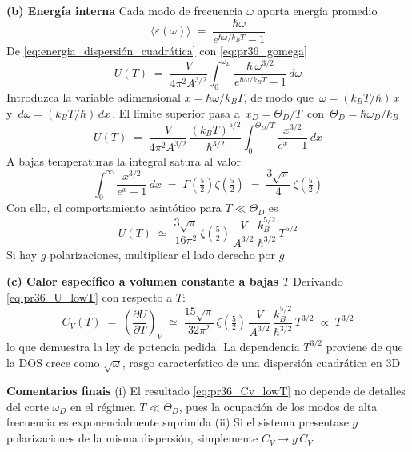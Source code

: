 \documentclass{article}
\begin{document}
\noindent\textbf{(b) Energía interna}\;
Cada modo de frecuencia $\omega$ aporta energía promedio
\begin{equation}
  \langle \varepsilon(\omega) \rangle \;=\; \frac{\hbar\omega}{e^{\hbar\omega/k_BT}-1}
  \label{eq:pr36_eps}
\end{equation}
De \eqref{eq:energia_dispersión_cuadrática} con \eqref{eq:pr36_gomega}
\begin{equation}
  U(T) \;=\; \frac{V}{4\pi^2 A^{3/2}} \int_0^{\omega_D} 
  \frac{\hbar\,\omega^{3/2}}{e^{\hbar\omega/k_BT}-1}\,d\omega
  \label{eq:pr36_U_raw}
\end{equation}
Introduzca la variable adimensional $x=\hbar\omega/k_BT$, de modo que $\,\omega=(k_BT/\hbar)\,x\,$ y $\,d\omega=(k_BT/\hbar)\,dx\,$. El límite superior pasa a $\,x_D=\Theta_D/T\,$ con $\,\Theta_D=\hbar\omega_D/k_B$
\begin{equation}
  U(T) \;=\; \frac{V}{4\pi^2 A^{3/2}}\,\frac{(k_BT)^{5/2}}{\hbar^{3/2}}
  \int_0^{\Theta_D/T} \frac{x^{3/2}}{e^{x}-1}\,dx
  \label{eq:pr36_U_dimless}
\end{equation}
A bajas temperaturas la integral satura al valor
\begin{equation}
  \int_0^{\infty}\frac{x^{3/2}}{e^{x}-1}\,dx \;=\; \Gamma\!\left(\tfrac{5}{2}\right)\zeta\!\left(\tfrac{5}{2}\right)
  \;=\; \frac{3\sqrt{\pi}}{4}\,\zeta\!\left(\tfrac{5}{2}\right)
  \label{eq:pr36_int}
\end{equation}
Con ello, el comportamiento asintótico para $T\ll \Theta_D$ es
\begin{equation}
  \boxed{\,U(T) \;\simeq\; \frac{3\sqrt{\pi}}{16\pi^2}\,
  \zeta\!\left(\tfrac{5}{2}\right)\,
  \frac{V}{A^{3/2}}\,
  \frac{k_B^{5/2}}{\hbar^{3/2}}\,
  T^{5/2}\,}
  \label{eq:pr36_U_lowT}
\end{equation}
Si hay $g$ polarizaciones, multiplicar el lado derecho por $g$

\noindent\textbf{(c) Calor específico a volumen constante a bajas $T$}\;
Derivando \eqref{eq:pr36_U_lowT} con respecto a $T$:
\begin{equation}
  \boxed{\,C_V(T) \;=\; \left(\frac{\partial U}{\partial T}\right)_V 
  \;\simeq\; \frac{15\sqrt{\pi}}{32\pi^2}\,
  \zeta\!\left(\tfrac{5}{2}\right)\,
  \frac{V}{A^{3/2}}\,
  \frac{k_B^{5/2}}{\hbar^{3/2}}\,
  T^{3/2}\;\propto\;T^{3/2}\,}
  \label{eq:pr36_Cv_lowT}
\end{equation}
lo que demuestra la ley de potencia pedida. La dependencia $T^{3/2}$ proviene de que la DOS crece como $\sqrt{\omega}$, rasgo característico de una dispersión cuadrática en 3D

\noindent\textbf{Comentarios finais}\;
(i) El resultado \eqref{eq:pr36_Cv_lowT} no depende de detalles del corte $\omega_D$ en el régimen $T\ll \Theta_D$, pues la ocupación de los modos de alta frecuencia es exponencialmente suprimida  
(ii) Si el sistema presentase $g$ polarizaciones de la misma dispersión, simplemente $C_V \to g\,C_V$
\end{document}
